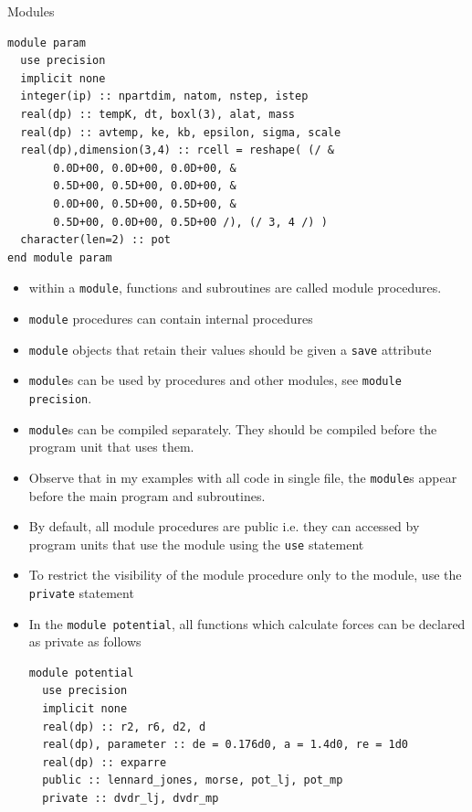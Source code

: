 \documentclass[c,mathserif,compress,xcolor=svgnames]{beamer}
\newcommand{\lstfortran}[1]{\lstinline[language={[90]Fortran},basicstyle=\footnotesize\ttfamily]|#1|}
\begin{document}
\begin{frame}{Modules}
\begin{lstlisting}[language={[90]Fortran},basicstyle=\fontsize{4}{5}\selectfont\ttfamily,multicols=2]
module param
  use precision
  implicit none
  integer(ip) :: npartdim, natom, nstep, istep
  real(dp) :: tempK, dt, boxl(3), alat, mass
  real(dp) :: avtemp, ke, kb, epsilon, sigma, scale
  real(dp),dimension(3,4) :: rcell = reshape( (/ &
       0.0D+00, 0.0D+00, 0.0D+00, &
       0.5D+00, 0.5D+00, 0.0D+00, &
       0.0D+00, 0.5D+00, 0.5D+00, &
       0.5D+00, 0.0D+00, 0.5D+00 /), (/ 3, 4 /) )
  character(len=2) :: pot
end module param
  \end{lstlisting}
  \vspace{-0.5cm}
  \begin{itemize}
    \item within a \lstfortran{module}, functions and subroutines are called module procedures.
    \item \lstfortran{module} procedures can contain internal procedures
    \item \lstfortran{module} objects that retain their values should be given a \lstfortran{save} attribute
    \item \lstfortran{module}s can be used by procedures and other modules, see \lstfortran{module precision}.
    \item \lstfortran{module}s can be compiled separately. {\color{red}They should be compiled before the program unit that uses them}.
    \item[] Observe that in my examples with all code in single file, the \lstfortran{module}s appear before the main program and subroutines.
  \end{itemize}

  \framebreak
    \begin{itemize}
      \item By default, all module procedures are public i.e. they can accessed by program units that use the module using the \lstfortran{use} statement
      \item To restrict the visibility of the module procedure only to the module, use the \lstfortran{private} statement
      \item In the \lstfortran{module potential}, all functions which calculate forces can be declared as private as follows
        \begin{lstlisting}[language={[90]Fortran},basicstyle=\fontsize{5}{6}\selectfont\ttfamily,mathescape]
module potential
  use precision
  implicit none
  real(dp) :: r2, r6, d2, d
  real(dp), parameter :: de = 0.176d0, a = 1.4d0, re = 1d0
  real(dp) :: exparre
  public :: lennard_jones, morse, pot_lj, pot_mp
  private :: dvdr_lj, dvdr_mp
  

\end{lstlisting}
\end{itemize}
\end{frame}
\end{document}
